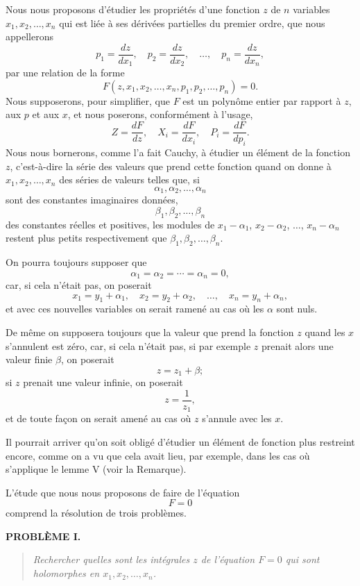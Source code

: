 \documentclass[11pt]{article}
\begin{document}
Nous nous proposons d'étudier les propriétés d'une fonction $z$ de $n$ variables $x_1,x_2,\ldots,x_n$ qui est liée à ses dérivées partielles du premier ordre, que nous appellerons
\[
p_1=\frac{dz}{dx_1},
\quad p_2=\frac{dz}{dx_2},
\quad \ldots,
\quad p_n=\frac{dz}{dx_n},
\]
par une relation de la forme
\[
F(z,x_1,x_2,\ldots,x_n,p_1,p_2,\ldots,p_n)=0.
\]
Nous supposerons, pour simplifier, que $F$ est un polynôme entier par rapport à $z$, aux $p$ et aux $x$, et nous poserons, conformément à l'usage,
\[
Z=\frac{dF}{dz},
\quad X_i=\frac{dF}{dx_i},
\quad P_i=\frac{dF}{dp_i}.
\]
Nous nous bornerons, comme l'a fait Cauchy, à étudier un élément de la fonction $z$, c'est-à-dire la série des valeurs que prend cette fonction quand on donne à $x_1,x_2,\ldots,x_n$ des séries de valeurs telles que, si
\[
\alpha_1,\alpha_2,\ldots,\alpha_n
\]
sont des constantes imaginaires données,
\[
\beta_1,\beta_2,\ldots,\beta_n
\]
des constantes réelles et positives, les modules de $x_1-\alpha_1$, $x_2-\alpha_2$, $\ldots$, $x_n-\alpha_n$ restent plus petits respectivement que $\beta_1,\beta_2,\ldots,\beta_n$.

On pourra toujours supposer que
\[
\alpha_1=\alpha_2=\cdots=\alpha_n=0,
\]
car, si cela n'était pas, on poserait
\[
x_1=y_1+\alpha_1,
\quad x_2=y_2+\alpha_2,
\quad \ldots,
\quad x_n=y_n+\alpha_n,
\]
et avec ces nouvelles variables on serait ramené au cas où les $\alpha$ sont nuls.

De même on supposera toujours que la valeur que prend la fonction $z$ quand les $x$ s'annulent est zéro, car, si cela n'était pas, si par exemple $z$ prenait alors une valeur finie $\beta$, on poserait
\[
z=z_1+\beta;
\]
si $z$ prenait une valeur infinie, on poserait
\[
z=\frac1{z_1},
\]
et de toute façon on serait amené au cas où $z$ s'annule avec les $x$.

Il pourrait arriver qu'on soit obligé d'étudier un élément de fonction plus restreint encore, comme on a vu que cela avait lieu, par exemple, dans les cas où s'applique le lemme V (voir la Remarque).

L'étude que nous nous proposons de faire de l'équation
\[
F=0
\]
comprend la résolution de trois problèmes.

\begin{center}
\textbf{PROBLÈME I.}
\end{center}

\begin{quote}\itshape
Rechercher quelles sont les intégrales $z$ de l'équation $F=0$ qui sont holomorphes en $x_1,x_2,\ldots,x_n$.
\end{quote}
\end{document}
